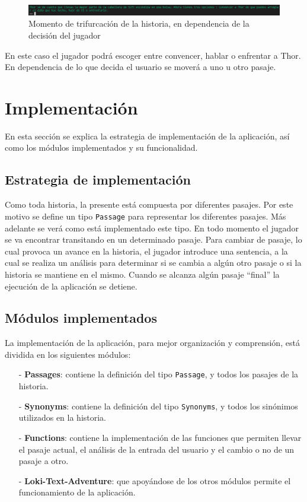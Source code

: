 \documentclass[12pt]{article}
\begin{document}
\begin{figure}[h]
	\begin{center}
		\includegraphics[width =15.0cm]{./img/Decision.png}

        \caption{Momento de trifurcación de la historia, en dependencia de la decisión del jugador}
	\end{center}
\end{figure}

En este caso el jugador podrá escoger entre convencer, hablar o enfrentar a Thor. En dependencia de lo que decida el usuario se moverá a uno u otro pasaje.

\section{Implementación}

En esta secci\'on se explica la estrategia de implementación de la aplicación, as\'i como los m\'odulos implementados y su funcionalidad.

\subsection{Estrategia de implementación}

Como toda historia, la presente está compuesta por diferentes pasajes. Por este motivo se define un tipo \verb|Passage| para representar los diferentes pasajes. Más adelante se verá como está implementado este tipo. En todo momento el jugador se va encontrar transitando en un determinado pasaje. Para cambiar de pasaje, lo cual provoca un avance en la historia, el jugador introduce una sentencia, a la cual se realiza un análisis para determinar si se cambia a algún otro pasaje o si la historia se mantiene en el mismo. Cuando se alcanza algún pasaje ``final'' la ejecución de la aplicación se detiene.

\subsection{Módulos implementados}

La implementación de la aplicación, para mejor organización y comprensión, está dividida en los siguientes módulos:

\begin{enumerate}
    \item[-] \textbf{Passages}: contiene la definición del tipo \verb|Passage|, y todos los pasajes de la historia.
    \item[-] \textbf{Synonyms}: contiene la definición del tipo \verb|Synonyms|, y todos los sinónimos utilizados en la historia.
    \item[-] \textbf{Functions}: contiene  la implementación de las funciones que permiten llevar el pasaje actual, el análisis de la entrada del usuario y el cambio o no de un pasaje a otro.
    \item[-] \textbf{Loki-Text-Adventure}: que apoyándose de los otros módulos permite el funcionamiento de la aplicación.
\end{enumerate}
 
\end{document}
